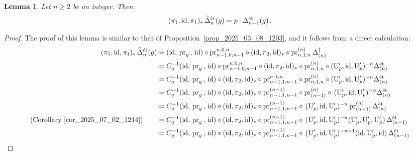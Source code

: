 \documentclass{amsart}
\numberwithin{equation}{section}
\newtheorem{lemma}[theorem]{Lemma}
\newcommand{\etale}{\textup{\'et}}
\begin{document}
\begin{lemma}
    \label{lemma_2025_03_08_1548}
    Let $n\geq 2$ be an integer. Then,
    $$(\pi_1,{\rm id},\pi_1)_*\,\widetilde{\Delta}_{n}^{\etale}(g)=p\cdot {\Delta}_{n-1}^{\etale}(g)\,.$$
\end{lemma}


\begin{proof}
    The proof of this lemma is similar to that of Proposition~\ref{prop_2025_03_08_1203}, and it follows from a direct calculation:
    \begin{align}
     \notag    (\pi_1, {\rm id},\pi_1)_*\,\widetilde{\Delta}_{n}^{\etale}(g)&= ({\rm id},\,{\rm pr}_g\,,\,{\rm id})\circ {\rm pr}^{n,0,n}_{n-1,0,n-1}\circ ({\rm id},\pi_2,{\rm id})_*\circ {\rm pr}^{(n)}_{n,1,n} \,\Delta_{(n)}^{\ddagger}\\
         \notag  &= C_q^{-1} ({\rm id},\,{\rm pr}_g\,,\,{\rm id})\circ {\rm pr}^{n,0,n}_{n-1,0,n-1}\circ ({\rm id},\pi_2,{\rm id})_*\circ {\rm pr}^{(n)}_{n,1,n} \circ (\mathrm{U}_{p}',{\rm id},\mathrm{U}_{p}')^{-n}\Delta_{(n)}^{\etale} \\
          \notag  &= C_q^{-1} ({\rm id},\,{\rm pr}_g\,,\,{\rm id})\circ ({\rm id},\pi_2,{\rm id})_*\circ {\rm pr}^{n,1,n}_{n-1,1,n-1} \circ  {\rm pr}^{(n)}_{n,1,n} \circ (\mathrm{U}_{p}',{\rm id},\mathrm{U}_{p}')^{-n}\Delta_{(n)}^{\etale} \\
         \notag  &= C_q^{-1} ({\rm id},\,{\rm pr}_g\,,\,{\rm id})\circ  ({\rm id},\pi_2,{\rm id})_*\circ {\rm pr}^{(n-1)}_{n-1,1,n-1} \circ {\rm pr}^{(n)}_{(n-1)}\circ \, (\mathrm{U}_{p}',{\rm id},\mathrm{U}_{p}')^{-n}\Delta_{(n)}^{\etale} \\
         \notag  &= C_q^{-1} ({\rm id},\,{\rm pr}_g\,,\,{\rm id})\circ  ({\rm id},\pi_2,{\rm id})_*\circ {\rm pr}^{(n-1)}_{n-1,1,n-1} \circ \, (\mathrm{U}_{p}',{\rm id},\mathrm{U}_{p}')^{-n}\,{\rm pr}^{(n)}_{(n-1)}\,\Delta_{(n)}^{\etale} \\
     \notag \hbox{(Corollary~\ref{cor_2025_07_02_1244})}\qquad  &= C_q^{-1} ({\rm id},\,{\rm pr}_g\,,\,{\rm id})\circ  ({\rm id},\pi_2,{\rm id})_*\circ {\rm pr}^{(n-1)}_{n-1,1,n-1} \circ \, (\mathrm{U}_{p}',{\rm id},\mathrm{U}_{p}')^{-n}(\mathrm{U}_{p}',\mathrm{U}_{p}',\mathrm{U}_{p}')\,\Delta_{(n-1)}^{\etale} \\
     \notag   &= C_q^{-1} ({\rm id},\,{\rm pr}_g\,,\,{\rm id})\circ  ({\rm id},\pi_2,{\rm id})_*\circ {\rm pr}^{(n-1)}_{n-1,1,n-1} \circ \, (\mathrm{U}_{p}',{\rm id},\mathrm{U}_{p}')^{-n+1}({\rm id},\mathrm{U}_{p}',{\rm id})\,\Delta_{(n-1)}^{\etale} \\

\end{align}
\end{proof}
\end{document}
